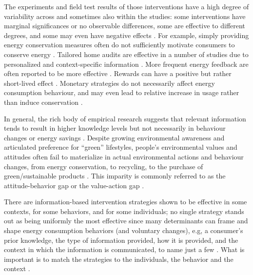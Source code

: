 \documentclass[a4paper,10pt]{article}
\begin{document}
The experiments and field test results of those interventions have a high degree of variability across and sometimes also within the studies: some interventions have marginal significances or no observable differences, some are effective to different degrees, and some may even have negative effects \citep{Abrahamse2005,Delmas2013}. For example, simply providing energy conservation measures often do not sufficiently motivate consumers to conserve energy \citep{Delmas2013}. Tailored home audits are effective in a number of studies due to personalized and context-specific information \citep{+}. More frequent energy feedback are often reported to be more effective \citep{+}. Rewards can have a positive but rather short-lived effect \citep{+}. Monetary strategies do not necessarily affect energy consumption behaviour, and may even lead to relative increase in usage rather than induce conservation \citep{Delmas2013,Asensio2015}. 

In general, the rich body of empirical research suggests that relevant information tends to result in higher knowledge levels but not necessarily in behaviour changes or energy savings \citep{Abrahamse2005,+}. Despite growing environmental awareness and articulated preference for ``green'' lifestyles, people's environmental values and attitudes often fail to materialize in actual environmental actions and behaviour changes, from energy conservation, to recycling,  to the purchase of green/sustainable products \citep{Schultz2002,Abrahamse2005,Claudy2013}. This imparity is commonly referred to as the attitude-behavior gap or the value-action gap \citep{Blake1999,Kollmuss2002,Claudy2013}. 

There are information-based intervention strategies shown to be effective in some contexts, for some behaviors, and for some individuals; no single strategy stands out as being uniformly the most effective \citep{Schultz2014} since many determinants can frame and shape energy consumption behaviors (and voluntary changes), e.g, a consumer's prior knowledge, the type of information provided, how it is provided, and the context in which the information is communicated, to name just a few \citep{Delmas2013,+}. What is important is to match the strategies to the individuals, the behavior and the context \citep{Schultz2014}. 
\end{document}
